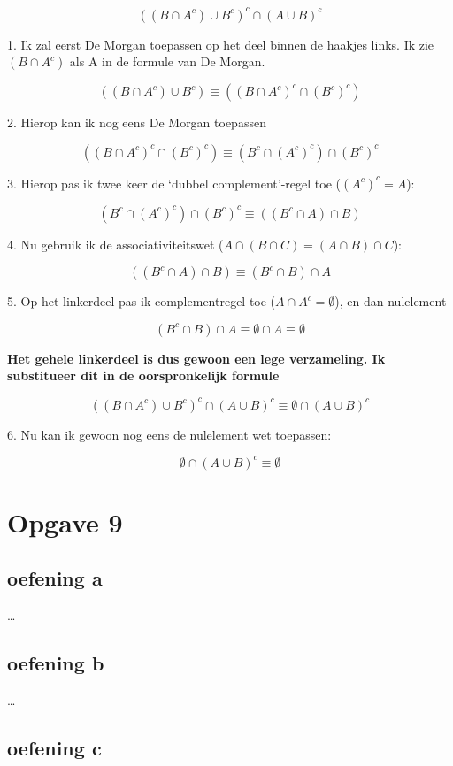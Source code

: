 \documentclass[11pt, a4paper]{article}
\begin{document}
\[
{((B \cap {A}^c) \cup {B}^c)}^c \cap {(A \cup B)}^c
\]

1. Ik zal eerst De Morgan toepassen op het deel binnen de haakjes links. Ik zie $(B \cap A^c)$ als A in de formule van De Morgan.

\[
((B \cap {A}^c) \cup {B}^c) \equiv (  {(B \cap A^c)}^c \cap {(B^c)}^c   )
\]

2. Hierop kan ik nog eens De Morgan toepassen

\[
(  {(B \cap A^c)}^c \cap {(B^c)}^c   )  \equiv (B^c \cap {(A^c)}^c) \cap {(B^c)}^c
\]

3. Hierop pas ik twee keer de `dubbel complement'-regel toe (${(A^c)}^c = A$):

\[
(B^c \cap {(A^c)}^c) \cap {(B^c)}^c \equiv ((B^c \cap A) \cap B)
\]

4. Nu gebruik ik de associativiteitswet ($A \cap (B \cap C) = (A \cap B) \cap C$):

\[
((B^c \cap A) \cap B)	\equiv	(B^c \cap B) \cap A
\]

5. Op het linkerdeel pas ik complementregel toe ($A \cap A^c = \emptyset$), en dan nulelement

\[
(B^c \cap B) \cap A 	\equiv		\emptyset \cap A 	\equiv \emptyset
\]

\textbf{Het gehele linkerdeel is dus gewoon een lege verzameling. Ik substitueer dit in de oorspronkelijk formule}

\[
{((B \cap {A}^c) \cup {B}^c)}^c \cap {(A \cup B)}^c \equiv \emptyset \cap {(A \cup B)}^c
\]

6. Nu kan ik gewoon nog eens de nulelement wet toepassen:

\[
\emptyset \cap {(A \cup B)}^c \equiv \boxed{\emptyset}
\]


\pagebreak
\section*{Opgave 9}


\subsection*{oefening a}

\ldots


\subsection*{oefening b}
\ldots


\pagebreak
\subsection*{oefening c}
\end{document}
